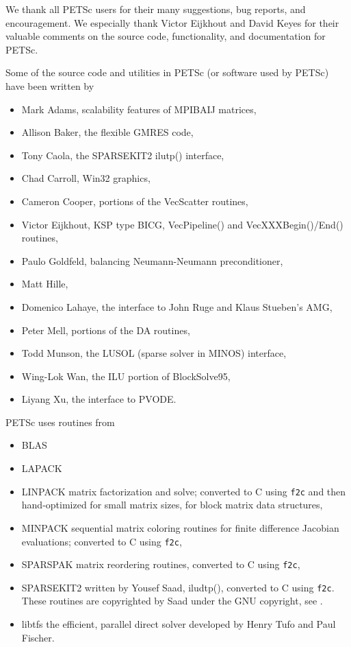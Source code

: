 %
%

\medskip \medskip \noindent
We thank all PETSc users for their many suggestions, bug reports, and
encouragement.  We especially thank Victor Eijkhout and David Keyes
for their valuable comments on the source code,
functionality, and documentation for PETSc.


\vspace{.3in}
\noindent
Some of the source code and utilities in PETSc (or software used by PETSc)
have been written by 
\begin{itemize}
  \item Mark Adams, scalability features of MPIBAIJ matrices,
  \item Allison Baker, the flexible GMRES code,
  \item Tony Caola, the SPARSEKIT2 ilutp() interface,
  \item Chad Carroll, Win32 graphics,
  \item Cameron Cooper, portions of the VecScatter routines, 
  \item Victor Eijkhout, KSP type BICG, VecPipeline() and VecXXXBegin()/End() routines, 
  \item Paulo Goldfeld, balancing Neumann-Neumann preconditioner,
  \item Matt Hille, 
  \item Domenico Lahaye, the interface to John Ruge and Klaus Stueben's AMG,
  \item Peter Mell, portions of the DA routines,
  \item Todd Munson, the LUSOL (sparse solver in MINOS) interface,
  \item Wing-Lok Wan, the ILU portion of BlockSolve95,
  \item Liyang Xu, the interface to PVODE.
\end{itemize}

\vspace{.3in}
\noindent
PETSc uses routines from 
\begin{itemize}
  \item BLAS
  \item LAPACK
  \item LINPACK      matrix factorization and solve; converted to C using {\tt f2c} and then 
                      hand-optimized for small matrix sizes, for block matrix data structures,
  \item MINPACK      sequential matrix coloring routines for finite difference Jacobian
                       evaluations; converted to C using {\tt f2c},
  \item SPARSPAK     matrix reordering routines, converted to C using {\tt f2c},
  \item SPARSEKIT2   written by Yousef Saad, iludtp(), converted to C using {\tt f2c}. These routines 
                     are copyrighted by Saad under the GNU copyright, see .
  \item libtfs the efficient, parallel direct solver developed by Henry Tufo and Paul Fischer.
\end{itemize}


